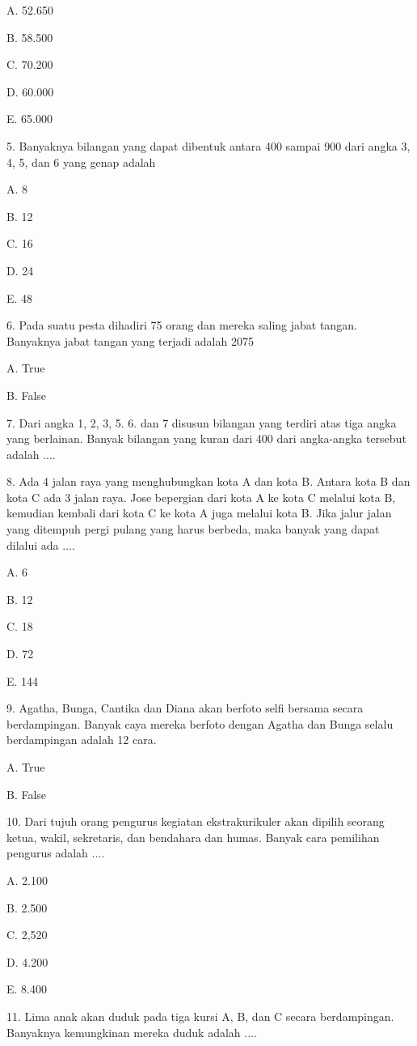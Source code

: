 \documentclass[11pt,fleqn]{book} %
\begin{document}
A. 
52.650

B. 
58.500

C. 
70.200

D. 
60.000

E. 
65.000

5. 
Banyaknya bilangan yang dapat dibentuk antara 400 sampai 900 dari angka 3, 4, 5, dan 6 yang genap adalah

A. 
8

B. 
12

C. 
16

D. 
24

E. 
48

6. 
Pada suatu pesta dihadiri 75 orang dan mereka saling jabat tangan. Banyaknya jabat tangan yang terjadi adalah 2075

A. 
True

B. 
False

7. 
Dari angka 1, 2, 3, 5. 6. dan 7 disusun bilangan yang terdiri atas tiga angka yang berlainan. Banyak bilangan yang kuran dari 400 dari angka-angka tersebut adalah ....

8. 
Ada 4 jalan raya yang menghubungkan kota A dan kota B. Antara kota B dan kota C ada 3 jalan raya. Jose bepergian dari kota A ke kota C melalui kota B, kemudian kembali dari kota C ke kota A juga melalui kota B. Jika jalur jalan yang ditempuh pergi pulang yang harus berbeda, maka banyak yang dapat dilalui ada ....

A. 
6

B. 
12

C. 
18

D. 
72

E. 
144

9. 
Agatha, Bunga, Cantika dan Diana akan berfoto selfi bersama secara berdampingan. Banyak caya mereka berfoto dengan Agatha dan Bunga selalu berdampingan adalah 12 cara.

A. 
True

B. 
False

10. 
Dari tujuh orang pengurus kegiatan ekstrakurikuler akan dipilih seorang ketua, wakil, sekretaris, dan bendahara dan humas. Banyak cara pemilihan pengurus adalah ....

A. 
2.100

B. 
2.500

C. 
2,520

D. 
4.200

E. 
8.400

11. 
Lima anak akan duduk pada tiga kursi A, B, dan C secara berdampingan. Banyaknya kemungkinan mereka duduk adalah 
....
\end{document}
